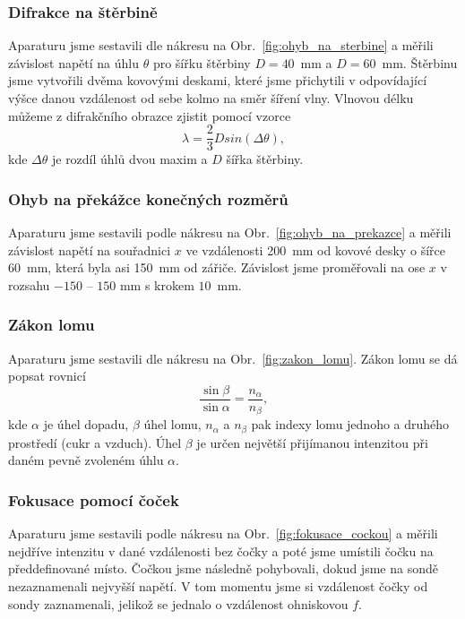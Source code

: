 \documentclass[english]{article}
\begin{document}
			\subsubsection{Difrakce na štěrbině}
					Aparaturu jsme sestavili dle nákresu na Obr.~\ref{fig:ohyb_na_sterbine} a měřili závislost napětí na úhlu $\theta$ pro šířku štěrbiny $D = 40$~mm a $D = 60$~mm. Štěrbinu jsme vytvořili dvěma kovovými deskami, které jsme přichytili v odpovídající výšce danou vzdálenost od sebe kolmo na směr šíření vlny. Vlnovou délku můžeme z difrakčního obrazce zjistit pomocí vzorce
					\begin{equation}
							\lambda = \frac{2}{3}Dsin(\Delta\theta),
							\label{eq:difrakce}
					\end{equation}
					kde $\Delta\theta$ je rozdíl úhlů dvou maxim a $D$ šířka štěrbiny. 
					
			\subsubsection{Ohyb na překážce konečných rozměrů}
				    Aparaturu jsme sestavili podle nákresu na Obr.~\ref{fig:ohyb_na_prekazce} a měřili závislost napětí na souřadnici $x$ ve vzdálenosti 200~mm od kovové desky o šířce 60~mm, která byla asi 150~mm od zářiče. Závislost jsme proměřovali na ose $x$ v rozsahu $-150$ -- $150$ mm s krokem $10$~mm.
					
					\subsubsection{Zákon lomu}
					Aparaturu jsme sestavili dle nákresu na Obr.~\ref{fig:zakon_lomu}. Zákon lomu se dá popsat rovnicí
					\begin{equation}
					\frac{\sin \beta}{\sin \alpha} = \frac{n_\alpha}{n_\beta},
					\label{eq:zakon_lomu}
					\end{equation}
					kde $\alpha$ je úhel dopadu, $\beta$ úhel lomu, $n_\alpha$ a $n_\beta$ pak indexy lomu jednoho a druhého prostředí (cukr a vzduch). Úhel $\beta$ je určen největší přijímanou intenzitou při daném pevně zvoleném úhlu $\alpha$.
					
			\subsubsection{Fokusace pomocí čoček}
					Aparaturu jsme sestavili podle nákresu na Obr.~\ref{fig:fokusace_cockou} a měřili nejdříve intenzitu v dané vzdálenosti bez čočky a poté jsme umístili čočku na předdefinované místo. Čočkou jsme následně pohybovali, dokud jsme na sondě nezaznamenali nejvyšší napětí. V tom momentu jsme si vzdálenost čočky od sondy zaznamenali, jelikož se jednalo o vzdálenost ohniskovou $f$.
					
\end{document}
